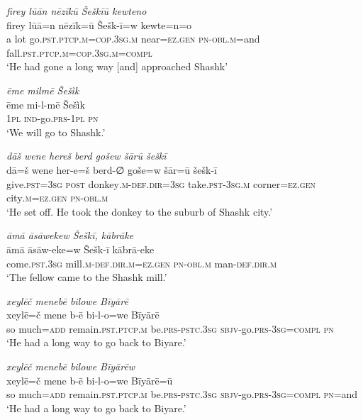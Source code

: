 \ea \label{HB.30}
\textit{firey lūān nēzīkū Šeškīū kewteno} \\ 
\gll firey lūā=n nēzīk=ū Šešk-ī=w kewte=n=o \\ 
 a lot go\textsc{.pst}\textsc{.ptcp}\textsc{.m}\textsc{=cop}\textsc{.3sg}\textsc{.m} near\textsc{=ez}\textsc{.gen} \textsc{pn}\textsc{-obl}\textsc{.m}=and fall\textsc{.pst}\textsc{.ptcp}\textsc{.m}\textsc{=cop}\textsc{.3sg}\textsc{.m}\textsc{=\textsc{compl}} \\ 
\glt `He had gone a long way [and] approached Shashk'
\z 
 
\ea \label{HB.32}
\textit{ēme milmē Šešìk} \\ 
\gll ēme mi-l-mē Šešìk \\ 
 \textsc{1pl} \textsc{ind-}go\textsc{.prs}\textsc{-1pl} \textsc{pn} \\ 
\glt `We will go to Shashk.'
\z 
 
\ea \label{HB.48}
\textit{dāš wene hereš berd gošew šārū šeškī} \\ 
\gll dā=š wene her-e=š berd-∅ goše=w šār=ū šešk-ī \\ 
 give\textsc{.pst}\textsc{=3sg} \textsc{post} donkey\textsc{.m}\textsc{-def}\textsc{.dir}\textsc{=3sg} take\textsc{.pst}\textsc{-3sg}\textsc{.m} corner\textsc{=ez}\textsc{.gen} city\textsc{.m}\textsc{=ez}\textsc{.gen} \textsc{pn}\textsc{-obl}\textsc{.m} \\ 
\glt `He set off. He took the donkey to the suburb of Shashk city.'
\z 
 
\ea \label{HB.60}
\textit{āmā āsāwekew Šeškī, kābrāke} \\ 
\gll āmā āsāw-eke=w Šešk-ī kābrā-eke \\ 
 come\textsc{.pst}\textsc{.3sg} mill\textsc{.m}\textsc{-def}\textsc{.dir}\textsc{.m}\textsc{=ez}\textsc{.gen} \textsc{pn}\textsc{-obl}\textsc{.m} man\textsc{-def}\textsc{.dir}\textsc{.m} \\ 
\glt `The fellow came to the Shashk mill.'
\z 
 
\ea \label{HB.65}
\textit{xeylēč menebē bilowe Bīyārē} \\ 
\gll xeylē=č mene b-ē bi-l-o=we Bīyārē \\ 
 so much\textsc{=add} remain\textsc{.pst}\textsc{.ptcp}\textsc{.m} be\textsc{.prs}\textsc{-pstc}\textsc{.3sg} \textsc{sbjv-}go\textsc{.prs}\textsc{-3sg}\textsc{=\textsc{compl}} \textsc{pn} \\ 
\glt `He had a long way to go back to Biyare.'
\z 
 
\ea \label{HB.66}
\textit{xeylēč menebē bilowe Bīyārēw} \\ 
\gll xeylē=č mene b-ē bi-l-o=we Bīyārē=ū \\ 
 so much\textsc{=add} remain\textsc{.pst}\textsc{.ptcp}\textsc{.m} be\textsc{.prs}\textsc{-pstc}\textsc{.3sg} \textsc{sbjv-}go\textsc{.prs}\textsc{-3sg}\textsc{=\textsc{compl}} \textsc{pn}=and \\ 
\glt `He had a long way to go back to Biyare.'
\z 
 
